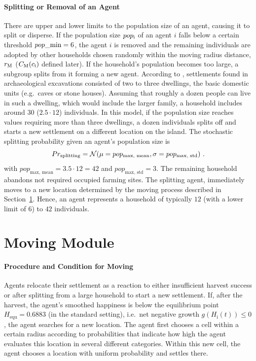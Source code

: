 \paragraph{Splitting or Removal of an Agent}
There are upper and lower limits to the population size of an agent, causing it to split or disperse.
If the population size $pop_{\rm i}$ of an agent $i$ falls below a certain threshold $pop\_{\rm min} = 6$, the agent $i$ is removed and the remaining individuals are adopted by other households chosen randomly within the moving radius distance, $r_{\rm M}$ ($C_{\rm M}(c_{\rm i})$ defined later).
If the household's population becomes too large, a subgroup splits from it forming a new agent.
According to \citet{Bahn2017}, settlements found in archaeological excavations consisted of two to three dwellings, the basic domestic units (e.g.\ caves or stone houses). 
Assuming that roughly a dozen people can live in such a dwelling, which would include the larger family, a household includes around $30$ ($2.5\cdot 12$) individuals.
In this model, if the population size reaches values requiring more than three dwellings, a dozen individuals splits off and starts a new settlement on a different location on the island. 
The stochastic splitting probability given an agent's population size is
\begin{equation}
Pr_{\rm splitting} = \mathcal{N}( \mu = pop_\text{max, mean}, \sigma = pop_\text{max, std})\ .
\end{equation}
with $pop_\text{max, mean} = 3.5 \cdot 12 = 42$ and $pop_\text{max, std} = 3$.
The remaining household abandons not required occupied farming sites.
The splitting agent, immediately moves to a new location determined by the moving process described in Section~\ref{sec:Moving}.
Hence, an agent represents a household of typically $12$ (with a lower limit of $6$) to $42$ individuals. %

\FloatBarrier
\section{Moving Module}\label{sec:Moving}
\paragraph{Procedure and Condition for Moving}
Agents relocate their settlement as a reaction to either insufficient harvest success or after splitting from a large household to start a new settlement.
If, after the harvest, the agent's smoothed happiness is below the equilibrium point $H_\text{equ}=0.6883$ (in the standard setting), i.e.\ net negative growth $g(H_\text{i}(t))\leq 0$, the agent searches for a new location.
The agent first chooses a cell within a certain radius according to probabilities that indicate how high the agent evaluates this location in several different categories.
Within this new cell, the agent chooses a location with uniform probability and settles there.

